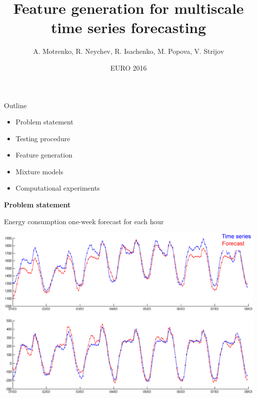 \documentclass{beamer}
\title[\hbox to 56mm{Multiscale forecasting\hfill\insertframenumber\,/\,\inserttotalframenumber}]{Feature generation for multiscale time series forecasting}
\author[V. Strijov]{A. Motrenko, R. Neychev, R. Isachenko, M. Popova, V. Strijov}
\institute{Moscow Institute of Physics and Technology}
\date{EURO 2016}
\begin{document}
\begin{frame}
\maketitle
\end{frame}
\begin{frame}{Outline}


\begin{itemize}
\item Problem statement
\item Testing procedure
\item Feature generation
\item Mixture models
\item Computational experiments
\end{itemize}

\end{frame}
\begin{frame}
\vfill
\begin{center}
{\Large \bf Problem statement}
\end{center}
\vfill
\end{frame}
\begin{frame}{Energy consumption one-week forecast for each hour}%

\includegraphics[width=\textwidth]{fig/fig9.eps}
\end{frame}
\end{document}
